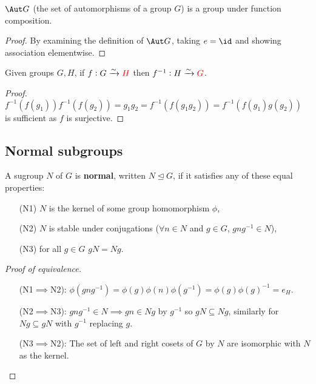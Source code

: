 \documentclass[../Year2.tex]{subfiles}
\begin{document}
\begin{theorem}
    $\Aut G$ (the set of automorphisms of a group $G$) is a group under function composition.
    \begin{proof}
        By examining the definition of $\Aut G$, taking $e=\id$ and showing association elementwise.
    \end{proof}
\end{theorem}

\begin{theorem}
    Given groups $G,H$, if $f:G\xrightarrow{\sim}\textcolor{red}{H}$ then $f^{-1}:H\xrightarrow{\sim}\textcolor{red}{G}$. 
    \begin{proof}
        $f^{-1}(f(g_1))f^{-1}(f(g_2))=g_1g_2=f^{-1}(f(g_1g_2))=f^{-1}(f(g_1)g(g_2))$ is sufficient as $f$ is surjective.
    \end{proof}
\end{theorem}

\subsection{Normal subgroups}

\begin{definition}
    A sugroup $N$ of $G$ is \textbf{normal}, written $N\unlhd G$, if it satisfies any of these equal properties: \begin{enumerate}
        \item[(N1)] $N$ is the kernel of some group homomorphism $\phi$,
        \item[(N2)] $N$ is stable under conjugations ($\forall n\in N$ and $g\in G$, $gng^{-1}\in N$),
        \item[(N3)] for all $g\in G$ $gN=Ng$.
    \end{enumerate}
    \begin{proof}[Proof of equivalence]
        \begin{enumerate}
            \item[] (N1$\implies$N2): $\phi(gng^{-1}) = \phi(g)\phi(n)\phi(g^{-1})=\phi(g)\phi(g)^{-1}=e_H$.
            \item[] (N2$\implies$N3): $gng^{-1}\in N\implies gn\in Ng$ by $g^{-1}$ so $gN\subseteq Ng$, similarly for $Ng\subseteq gN$ with $g^{-1}$ replacing $g$.
            \item[] (N3$\implies$N2): The set of left and right cosets of $G$ by $N$ are isomorphic with $N$ as the kernel.
        \end{enumerate}
        \vspace{-12pt}
    \end{proof} 
\end{definition}
\vspace{-10pt}
\end{document}
